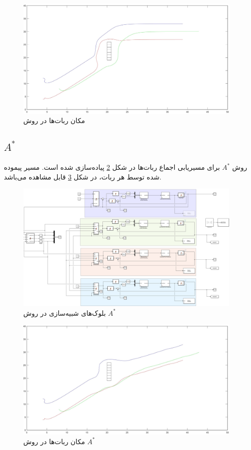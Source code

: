 \begin{figure}[!h]
	\centering
	\includegraphics[scale=0.2]{Images/platoon-Greedy-pos.jpg}
	\caption{مکان ربات‌ها در روش }\label{Fig platoon-Greedy-pos}
\end{figure}


\subsection{$A^*$}
روش $A^*$ برای مسیریابی اجماع ربات‌ها در شکل \ref{Fig platoon-A-star-simulink} پیاده‌سازی شده است. مسیر پیموده شده توسط هر ربات، در شکل \ref{Fig platoon-A-star-pos} قابل مشاهده می‌باشد.
\begin{figure}[!h]
	\centering
	\includegraphics[scale=0.22]{Images/platoon-A-star-simulink.png}
	\caption{بلوک‌های شبیه‌سازی در روش $A^*$}\label{Fig platoon-A-star-simulink}
\end{figure}

\begin{figure}[!h]
	\centering
	\includegraphics[scale=0.2]{Images/platoon-A-star-pos.jpg}
	\caption{مکان ربات‌ها در روش $A^*$}\label{Fig platoon-A-star-pos}
\end{figure}


